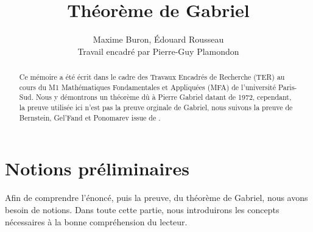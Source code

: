 \documentclass[a4paper,10pt]{article}
\title{Théorème de Gabriel}
\author{Maxime Buron, Édouard Rousseau\\
Travail encadré par Pierre-Guy Plamondon}
\begin{document}
\maketitle

\begin{abstract} 
	Ce mémoire a été écrit dans le cadre des Travaux Encadrés de Recherche (TER) au cours du M1 Mathématiques Fondamentales et Appliquées (MFA) de l'université Paris-Sud. Nous y démontrons un théorème dû à Pierre Gabriel datant de 1972, cependant, la preuve utilisée ici n'est pas la preuve orginale de Gabriel, nous suivons la preuve de Bernstein, Gel'Fand et Ponomarev issue de \cite{BGP72}.
\end{abstract}

\tableofcontents

\clearpage
        
\section{Notions préliminaires}
Afin de comprendre l'énoncé, puis la preuve, du théorème de Gabriel, nous avons besoin de notions. Dans toute cette partie, nous introduirons les concepts nécessaires à la bonne compréhension du lecteur.
\end{document}
